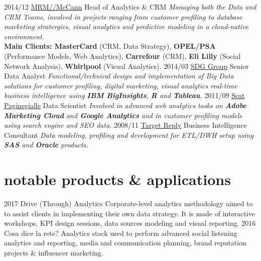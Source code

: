 \documentclass[hidelinks]{gabrielebaldassarre-cv}
\begin{document}
\begin{entrylist}
  \entry
    {2014/12}
    {\href{https://mrm-mccann.com/locations/it/en/milan.html}{MRM//McCann}}
    {Head of Analytics \& CRM}
    {\emph{Managing both the Data and CRM Teams, involved in projects ranging from
customer profiling to database marketing stratergies, visual analytics and predictive modeling in a cloud-native environment.}\\

    \textbf{Main Clients: MasterCard} (CRM, Data Strategy), \textbf{OPEL/PSA} (Performance Models, Web Analytics), \textbf{Carrefour} (CRM), \textbf{Eli Lilly} (Social Network Analysis), \textbf{Whirlpool} (Visual Analytics).}
  \entry
    {2014/03}
    {\href{http://www.sdggroup.com/it}{SDG Group}}
    {Senior Data Analyst}
    {\emph{Functional/technical design and implementation of Big Data solutions for customer profiling, digital marketing, visual analytics real-time business intelligence using \textbf{IBM BigInsights}, \textbf{R} and \textbf{Tableau}.}}
  \entry
    {2011/09}
    {\href{http://www.paginegialle.it}{Seat Paginegialle}}
    {Data Scientist}
    {\emph{Involved in advanced web analytics tasks on \textbf{Adobe Marketing Cloud} and \textbf{Google Analytics} and in customer profiling models using search engine and SEO data.}}
  \entry
    {2008/11}
    {\href{https://www.reply.com/it/topics/big-data-and-analytics/homepage}{Target Reply}}
    {Business Intelligence Consultant}
    {\emph{Data modeling, profiling and development for ETL/DWH setup using \textbf{SAS} and \textbf{Oracle} products.}}
\end{entrylist}

\section{notable products \& applications}

\begin{entrylist}
  \entry
    {2017}
    {Drive (Through) Analytics}
    {}
    {Corporate-level analytics methodology aimed to to assist clients in implementing their own data strategy. It is made of interactive workshops, KPI design sessions, data sources modeling and visual reporting.}
 \entry
    {2016}
    {Cosa dice la rete?}
    {}
    {Analytics stack used to perform advanced social listening analytics and reporting, media and communication planning, brand reputation projects \& influencer marketing.}
\end{entrylist}
\end{document}
